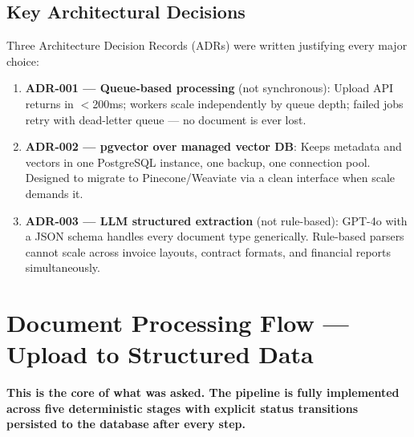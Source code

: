 \documentclass[12pt,a4paper]{article}
\newcommand{\keypoint}[1]{%
  \begin{tcolorbox}[colback=HighlightYellow, colframe=NordicGold,
    boxrule=1.2pt, arc=4pt, left=8pt, right=8pt, top=5pt, bottom=5pt]
    \faExclamationCircle\hspace{6pt}\textbf{#1}
  \end{tcolorbox}
}
\begin{document}
\subsection{Key Architectural Decisions}

Three Architecture Decision Records (ADRs) were written justifying every major choice:

\begin{enumerate}[leftmargin=*]
  \item \textbf{ADR-001 — Queue-based processing} (not synchronous): Upload API returns in $<$200ms; workers scale independently by queue depth; failed jobs retry with dead-letter queue — no document is ever lost.

  \item \textbf{ADR-002 — pgvector over managed vector DB}: Keeps metadata and vectors in one PostgreSQL instance, one backup, one connection pool. Designed to migrate to Pinecone/Weaviate via a clean interface when scale demands it.

  \item \textbf{ADR-003 — LLM structured extraction} (not rule-based): GPT-4o with a JSON schema handles every document type generically. Rule-based parsers cannot scale across invoice layouts, contract formats, and financial reports simultaneously.
\end{enumerate}

\newpage

\section{Document Processing Flow — Upload to Structured Data}

\keypoint{This is the core of what was asked. The pipeline is fully implemented across five deterministic stages with explicit status transitions persisted to the database after every step.}
\end{document}
